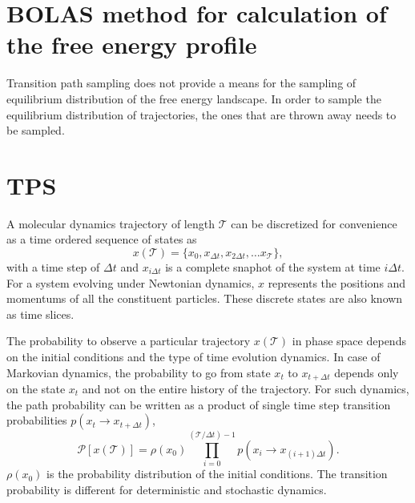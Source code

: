 \documentclass{article}
\begin{document}
\section{BOLAS method for calculation of the free energy profile}

Transition path sampling does not provide a means for the sampling of equilibrium distribution of the 
free energy landscape. In order to sample the equilibrium distribution of trajectories, the ones that 
are thrown away needs to be sampled. 


\section{TPS}
A molecular dynamics trajectory of length $\mathcal{T}$ can be discretized 
for convenience as a time ordered sequence of states as
\begin{equation}
x(\mathcal{T}) = \{x_0,x_{\Delta t},x_{2\Delta t},\ldots x_{\mathcal{T}}\},
\end{equation}
with a time step of $\Delta t$ and $x_{i\Delta t}$ is a complete snaphot of the
system at time $i\Delta t$. For a system evolving under Newtonian dynamics, $x$
represents the positions and momentums of all the constituent particles. These 
discrete states are also known as time slices. 

 The probability to observe a particular trajectory $x(\mathcal{T})$ in phase space depends on the 
 initial conditions and the type of time evolution dynamics. In case of Markovian dynamics, the 
 probability to go from state $x_t$ to $x_{t+\Delta t}$ depends only on the 
 state $x_t$ and not on the entire history of the trajectory. For such dynamics, the 
 path probability can be written as a product of single time step transition probabilities
 $p(x_t\rightarrow x_{t+\Delta t})$,
 \begin{equation}
\mathcal{P}[x(\mathcal{T})] = \rho(x_0)\prod^{(\mathcal{T}/\Delta t)-1}_{i=0}p(x_i\rightarrow x_{(i+1)\Delta t}).
 \end{equation}
 $\rho(x_0)$ is the probability distribution of the initial conditions. The transition probability
 is different for deterministic and stochastic dynamics.  
\end{document}
